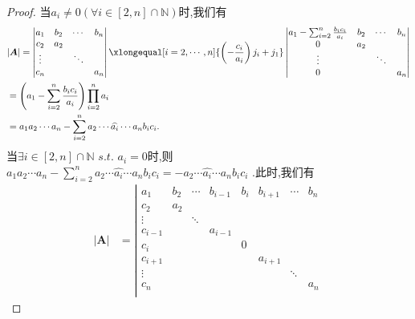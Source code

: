 \documentclass[lang=cn,newtx,10pt,scheme=chinese]{elegantbook}
\begin{document}
\begin{proof}
    当$a_i\ne 0\left( \forall i\in \left[ 2,n \right] \cap \mathbb{N}  \right)$时,我们有
    \begin{align*}
            &|\boldsymbol{A}|=\left| \begin{matrix}
                a_1&		b_2&		\cdots&		b_n\\
                c_2&		a_2&		&		\\
                \vdots&		&		\ddots&		\\
                c_n&		&		&		a_n\\
            \end{matrix} \right|\xlongequal[i=2,\cdots ,n]{\left( -\frac{c_i}{a_i} \right) j_i+j_1}\left| \begin{matrix}
                a_1-\sum_{i=2}^n{\frac{b_ic_i}{a_i}}&		b_2&		\cdots&		b_n\\
                0&		a_2&		&		\\
                \vdots&		&		\ddots&		\\
                0&		&		&		a_n\\
            \end{matrix} \right|
            \\
            &=\left( a_1-\sum_{i=2}^n{\frac{b_ic_i}{a_i}} \right) \prod\limits_{i=2}^n{a_i}
            \\
            &=a_1a_2\cdots a_n-\sum_{i=2}^n{a_2}\cdots \widehat{a_i}\cdots a_nb_ic_i.
    \end{align*}
    当$\exists i\in \left[ 2,n \right] \cap \mathbb{N} \,\,s.t. \,\,a_i=0$时,则
    $a_1a_2\cdots a_n-\sum_{i=2}^n{a_2}\cdots \widehat{a_i}\cdots a_nb_ic_i=-a_2\cdots \widehat{a_i}\cdots a_nb_ic_i$
    .此时,我们有
    \begin{align*}
            |\boldsymbol{A}| &= \left| \begin{matrix}
                a_1 & b_2 & \cdots & b_{i-1} & b_i & b_{i+1} & \cdots & b_n \\
                c_2 & a_2 & & & & & & \\
                \vdots & & \ddots & & & & & \\
                c_{i-1} & & & a_{i-1} & & & & \\
                c_i & & & & 0 & & & \\
                c_{i+1} & & & & & a_{i+1} & & \\
                \vdots & & & & & & \ddots & \\
                c_n & & & & & & & a_n \\

\end{matrix}
\end{align*}
\end{proof}
\end{document}
